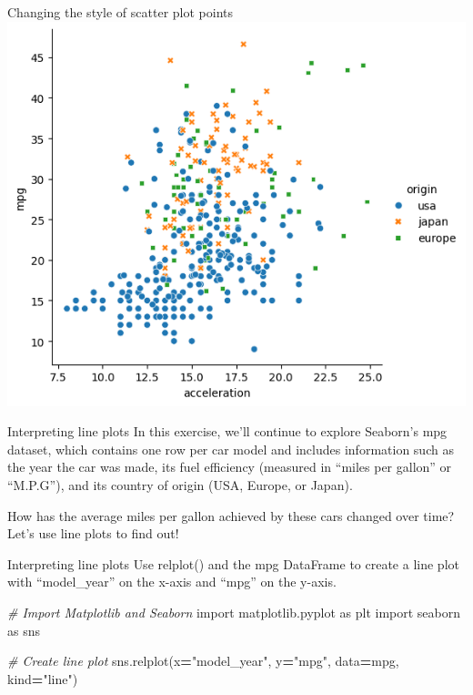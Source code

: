 \documentclass[
  ignorenonframetext,
]{beamer}
\newenvironment{Shaded}{\begin{snugshade}}{\end{snugshade}}
\newcommand{\CommentTok}[1]{\textcolor[rgb]{0.56,0.35,0.01}{\textit{#1}}}
\newcommand{\ImportTok}[1]{#1}
\newcommand{\NormalTok}[1]{#1}
\newcommand{\OperatorTok}[1]{\textcolor[rgb]{0.81,0.36,0.00}{\textbf{#1}}}
\newcommand{\StringTok}[1]{\textcolor[rgb]{0.31,0.60,0.02}{#1}}
\begin{document}
\begin{frame}{Changing the style of scatter plot points}
\label{changing-the-style-of-scatter-plot-points-6}
\includegraphics{../images/im270.png}
\end{frame}

\begin{frame}{Interpreting line plots}
\label{interpreting-line-plots}
In this exercise, we'll continue to explore Seaborn's mpg dataset, which
contains one row per car model and includes information such as the year
the car was made, its fuel efficiency (measured in ``miles per gallon''
or ``M.P.G''), and its country of origin (USA, Europe, or Japan).

How has the average miles per gallon achieved by these cars changed over
time? Let's use line plots to find out!
\end{frame}

\begin{frame}[fragile]{Interpreting line plots}
\label{interpreting-line-plots-1}
Use relplot() and the mpg DataFrame to create a line plot with
``model\_year'' on the x-axis and ``mpg'' on the y-axis.


\begin{Shaded}
\begin{Highlighting}[]
\CommentTok{\# Import Matplotlib and Seaborn}
\ImportTok{import}\NormalTok{ matplotlib.pyplot }\ImportTok{as}\NormalTok{ plt}
\ImportTok{import}\NormalTok{ seaborn }\ImportTok{as}\NormalTok{ sns}

\CommentTok{\# Create line plot}
\NormalTok{sns.relplot(x}\OperatorTok{=}\StringTok{"model\_year"}\NormalTok{, y}\OperatorTok{=}\StringTok{"mpg"}\NormalTok{,}
\NormalTok{            data}\OperatorTok{=}\NormalTok{mpg, kind}\OperatorTok{=}\StringTok{"line"}\NormalTok{)}
\end{Highlighting}
\end{Shaded}
\end{frame}
\end{document}
